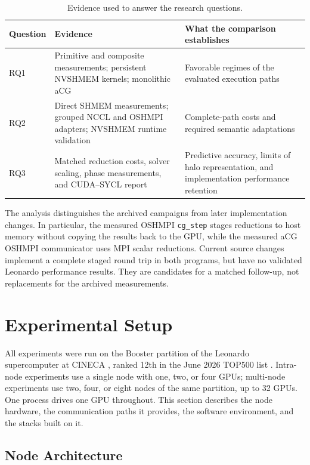 \begin{table}[htbp]
\centering
\caption{Evidence used to answer the research questions.}
\label{tab:m-artifact-evidence}
\footnotesize
\begin{tabularx}{\textwidth}{lYY}
\toprule
Question & Evidence & What the comparison establishes\\
\midrule
RQ1 & Primitive and composite measurements; persistent NVSHMEM kernels; monolithic aCG & Favorable regimes of the evaluated execution paths\\
RQ2 & Direct SHMEM measurements; grouped NCCL and OSHMPI adapters; NVSHMEM runtime validation & Complete-path costs and required semantic adaptations\\
RQ3 & Matched reduction costs, solver scaling, phase measurements, and CUDA--SYCL report & Predictive accuracy, limits of halo representation, and implementation performance retention\\
\bottomrule
\end{tabularx}
\end{table}

The analysis distinguishes the archived campaigns from later implementation changes. In particular, the measured OSHMPI \texttt{cg\_step} stages reductions to host memory without copying the results back to the GPU, while the measured aCG OSHMPI communicator uses MPI scalar reductions. Current source changes implement a complete staged round trip in both programs, but have no validated Leonardo performance results. They are candidates for a matched follow-up, not replacements for the archived measurements.

\section{Experimental Setup}\label{sec:eval-environment}

All experiments were run on the Booster partition of the Leonardo supercomputer at CINECA \cite{turisini_leonardo_2024}, ranked 12th in the June 2026 TOP500 list \cite{top500_june2026}. Intra-node experiments use a single node with one, two, or four GPUs; multi-node experiments use two, four, or eight nodes of the same partition, up to 32 GPUs. One process drives one GPU throughout. This section describes the node hardware, the communication paths it provides, the software environment, and the stacks built on it.

\subsection{Node Architecture}

